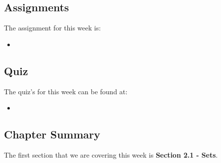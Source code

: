 \subsection{Assignments}

The assignment for this week is:

\begin{itemize}
    \item {}
\end{itemize}

\subsection{Quiz}

The quiz's for this week can be found at:

\begin{itemize}
    \item {}
\end{itemize}

\subsection{Chapter Summary}

The first section that we are covering this week is \textbf{Section 2.1 - Sets}.

